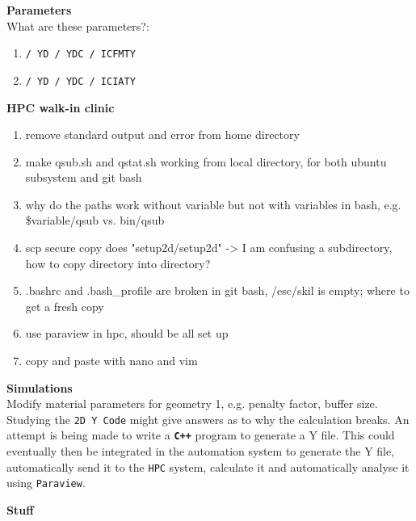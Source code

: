 {\color{blue}\textbf{}}

\bigbreak
\textbf{Parameters}\\
What are these parameters?:
\begin{enumerate}[topsep=0pt,itemsep=-1ex,partopsep=1ex,parsep=1ex,label=\Alph*)]
    \item \texttt{/ YD / YDC / ICFMTY}
    \item \texttt{/ YD / YDC / ICIATY}
\end{enumerate}

\bigbreak
\textbf{HPC walk-in clinic \textbf{}}
        \begin{enumerate}[topsep=0pt,itemsep=-1ex,partopsep=1ex,parsep=1ex,label=\Alph*)]
            \item remove standard output and error from home directory
            \item make qsub.sh and qstat.sh working from local directory, for both ubuntu subsystem and git bash
            \item why do the paths work without variable but not with variables in bash, e.g. \$variable/qsub vs. bin/qsub
            \item scp secure copy does "setup2d/setup2d" -> I am confusing a subdirectory, how to copy directory into directory?
            \item .bashrc and .bash\_profile are broken in git bash, /esc/skil is empty;	where to get a fresh copy
            \item use paraview in hpc, should be all set up
            \item copy and paste with nano and vim
        \end{enumerate}

\bigbreak
\textbf{Simulations}\\
Modify material parameters for geometry 1, e.g. penalty factor, buffer size. Studying the \texttt{\texttt{2D} \texttt{Y} Code} might give answers as to why the calculation breaks. An attempt is being made to write a \textbf{\texttt{C++}} program to generate a Y file. This could eventually then be integrated in the automation system to generate the Y file, automatically send it to the \texttt{HPC} system, calculate it and automatically analyse it using \texttt{Paraview}.

\bigbreak
{\color{blue}\textbf{}}

\bigbreak
\textbf{Stuff}
